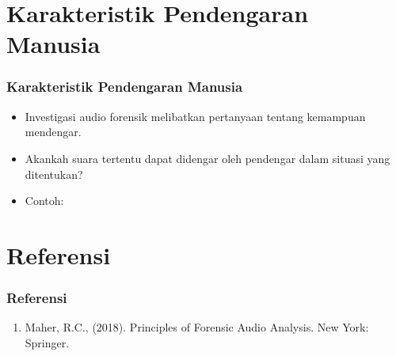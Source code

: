 \documentclass[pdflatex,compress]{beamer}
\begin{document}
\section{Karakteristik Pendengaran Manusia}

\begin{frame}
	\frametitle{Karakteristik Pendengaran Manusia}
	\begin{itemize}
		\item Investigasi audio forensik melibatkan pertanyaan tentang kemampuan mendengar.
		\item Akankah suara tertentu dapat didengar oleh pendengar dalam situasi yang ditentukan?
		\item Contoh: 
	\end{itemize}
\end{frame}

\section{Referensi}

\begin{frame}
	\frametitle{Referensi}
	\begin{enumerate}
		\item Maher, R.C., (2018). Principles of Forensic Audio Analysis. New York: Springer.
	\end{enumerate}
\end{frame}
\end{document}
